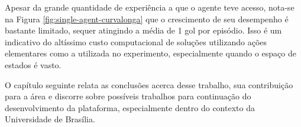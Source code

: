 Apesar da grande quantidade de experiência a que o agente teve acesso, nota-se na Figura \ref{fig:single-agent-curvalonga} que o crescimento de seu desempenho é bastante limitado, sequer atingindo a média de 1 gol por episódio. Isso é um indicativo do altíssimo custo computacional de soluções utilizando ações elementares como a utilizada no experimento, especialmente quando o espaço de estados é vasto.

O capítulo seguinte relata as conclusões acerca desse trabalho, sua contribuição para a área e discorre sobre possíveis trabalhos para continuação do desenvolvimento da plataforma, especialmente dentro do contexto da Universidade de Brasília.


 


